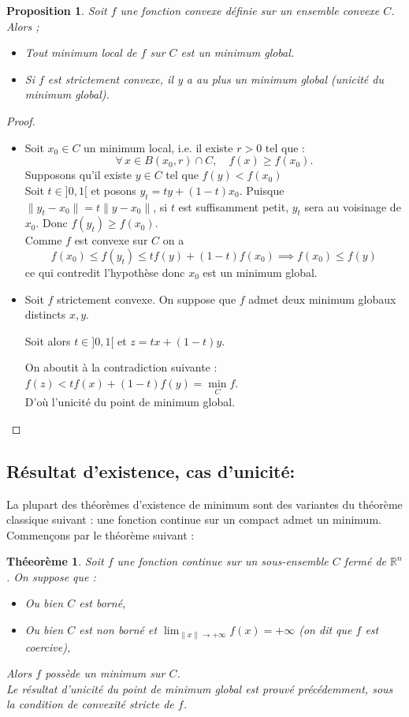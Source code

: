 \documentclass[12pt,a4paper,openay]{book}
\numberwithin{equation}{chapter}
\newtheorem{theo}{Th\'eeor\`eme}[chapter]
\newtheorem{prop}{Proposition}[chapter]
\newcommand{\R}{\mathbb{R}}
\let\oldforall\forall
\renewcommand{\forall}{\oldforall\,}
\begin{document}
	\begin{prop}
		Soit $f$ une fonction convexe d\'efinie sur un ensemble convexe $C$. Alors ;
		\begin{itemize}
		\item Tout minimum local de $f$ sur $C$ est un minimum global.
				\item Si $f$ est strictement convexe, il y a au plus un minimum global (unicit\'e du minimum global).
		\end{itemize}
	\end{prop}
	\begin{proof}
		\hfill
		\begin{itemize}
		\item Soit $x_0 \in C$ un minimum local, i.e. il existe $r>0$ tel que  :
		$$
		\forall x \in B\left(x_0, r\right)\cap C, \quad f(x) \geq f\left(x_0\right) .
		$$	
		Supposons qu'il existe $y\in C$ tel que $f(y) < f(x_0)$\\
		Soit $t\in ]0,1[$ et posons $y_t = ty+ (1-t) x_0$. Puisque $\| y_t-x_0\|= t\|y-x_0\|$, si $t$ est suffisamment petit, $y_t$ sera au voisinage de $x_0$. Donc $f(y_t) \geq f(x_0)$.\\
		Comme $f$ est convexe sur $C$ on a 
		\[
		f(x_0) \leq f(y_t) \leq tf(y) + (1-t)f(x_0) \implies f(x_0) \leq f(y)
		\]
		ce qui contredit l'hypothèse donc $x_0$ est un minimum global.
		\item Soit $f$ strictement convexe. On suppose que $f$ admet deux minimum globaux distincts $x, y$.
			
			Soit alors $t \in] 0,1[$ et $z=t x+(1-t) y$.
			
		On aboutit \`a la contradiction suivante : $f(z)<t f(x)+(1-t) f(y)=\min\limits_C f$.\\
		D'o\`u l'unicit\'e du point de minimum global.
	\end{itemize}
	\end{proof}
	
	\subsection{R\'esultat d'existence, cas d'unicit\'e:}
	La plupart des th\'eor\`emes d'existence de minimum sont des variantes du th\'eor\`eme classique suivant : une fonction continue sur un compact admet un minimum.\\
	Commen\c{c}ons par le th\'eor\`eme suivant :	
	\begin{theo}
	Soit $f$ une fonction continue sur un sous-ensemble $C$ ferm\'e de $\R^n$.
		On suppose que :
		\begin{itemize}
			\item Ou bien $C$ est born\'e,
			\item Ou bien $C$ est non born\'e et $\lim _{\|x\| \to+\infty} f(x)=+\infty$ (on dit que $f$ est coercive),
		\end{itemize}	
		Alors $f$ poss\`ede un minimum sur $C$.\\
		Le r\'esultat d'unicit\'e du point de minimum global est prouv\'e pr\'ec\'edemment, sous la condition de convexit\'e stricte de $f$.
	\end{theo}
\end{document}
